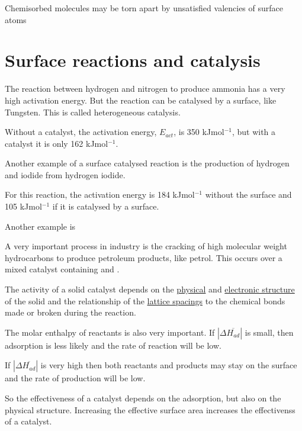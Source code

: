 \documentclass[ignorenonframetext]{beamer}
\begin{document}
Chemisorbed molecules may be torn apart by unsatisfied valencies of surface atoms

\section{Surface reactions and catalysis}

The reaction between hydrogen and nitrogen to produce ammonia has a very high activation energy. But the reaction can be catalysed by a surface, like Tungsten. This is called heterogeneous catalysis.


Without a catalyst, the activation energy, \(E_{act}\), is 350 kJmol\(^{-1}\), but with a catalyst it is only 162 kJmol\(^{-1}\).

Another example of a surface catalysed reaction is the production of hydrogen and iodide from hydrogen iodide.


For this reaction, the activation energy is 184 kJmol\(^{-1}\) without the surface and 105 kJmol\(^{-1}\) if it is catalysed by a surface. 

Another example is 



A very important process in industry is the cracking of high molecular weight hydrocarbons to produce petroleum products, like petrol. This occurs over a mixed catalyst containing  and .

\medskip The activity of a solid catalyst depends on the \underline{physical} and \underline{electronic structure} of the solid and the relationship of the \underline{lattice spacings} to the chemical bonds made or broken during the reaction.

The molar enthalpy of reactants is also very important. If \(|\Delta \overline{H_{ad}}|\) is small, then adsorption is less likely and the rate of reaction will be low.

If \(|\Delta \overline{H_{ad}}|\) is very high then both reactants and products may stay on the surface and the rate of production will be low.

So the effectiveness of a catalyst depends on the adsorption, but also on the physical structure. Increasing the effective surface area increases the effectivenss of a catalyst.
\end{document}
